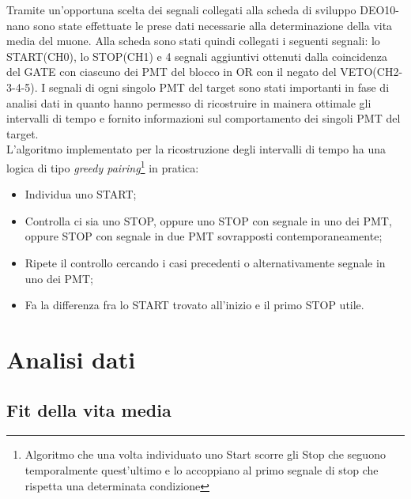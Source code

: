 \documentclass[10pt,a4paper]{article}
\begin{document}
Tramite un'opportuna scelta dei segnali collegati alla scheda di sviluppo DEO10-nano sono state effettuate le prese dati necessarie alla determinazione della vita media del muone. Alla scheda sono stati quindi collegati i seguenti segnali: lo START(CH0), lo STOP(CH1) e 4 segnali aggiuntivi ottenuti dalla coincidenza del GATE con ciascuno dei PMT del blocco in OR con il negato del VETO(CH2-3-4-5).
I segnali di ogni singolo PMT del target sono stati importanti in fase di analisi dati in quanto hanno permesso di ricostruire in mainera ottimale gli intervalli di tempo e fornito informazioni sul comportamento dei singoli PMT del target.\\
L'algoritmo implementato per la ricostruzione degli intervalli di tempo ha una logica di tipo \textit{greedy pairing}\footnote{Algoritmo che una volta individuato uno Start scorre gli Stop che seguono temporalmente quest'ultimo e lo accoppiano al primo segnale di stop che rispetta una determinata condizione} in pratica:
\begin{itemize}
\item Individua uno START;
\item Controlla ci sia uno STOP, oppure uno STOP con segnale in uno dei PMT, oppure STOP con segnale in due PMT sovrapposti contemporaneamente;
\item Ripete il controllo cercando i casi precedenti o alternativamente segnale in uno dei PMT;
\item Fa la differenza fra lo START trovato all'inizio e il primo STOP utile.
\end{itemize}

\section{Analisi dati}

\subsection{Fit della vita media}
\end{document}
